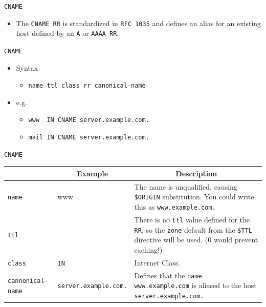 \documentclass[xcolor=table]{beamer}
\begin{document}
\begin{frame}{\texttt{CNAME}}
  \begin{itemize}
      \item The \texttt{CNAME RR} is standardized in \texttt{RFC 1035} and defines an alias for an existing host defined by an \texttt{A} or \texttt{AAAA RR}.
  \end{itemize}
\end{frame}

\begin{frame}{\texttt{CNAME}}
  \begin{itemize}
    \item Syntax
      \begin{itemize}
        \item \texttt{name ttl class rr canonical-name}
      \end{itemize}
    \item e.g.
      \begin{itemize}
        \item \texttt{www ~IN CNAME server.example.com.}
        \item \texttt{mail IN CNAME server.example.com.}
      \end{itemize}
  \end{itemize}
\end{frame}

\begin{frame}{\texttt{CNAME}}
  \begin{table}
    \tiny
    \begin{tabular}{|p{1.6cm}|p{1.9cm}|p{4.7cm}|} 
      \hline
      \rowcolor{gray}
      \multicolumn{1}{|c|}{Syntax} & \multicolumn{1}{c|}{Example} & \multicolumn{1}{c|}{Description}\\ 
      \hline
      \texttt{name}&www&The name is unqualified, causing \texttt{\$ORIGIN} substitution. You could write this as \texttt{www.example.com.}\\
      \hline
      \texttt{ttl}&&There is no \texttt{ttl} value defined for the \texttt{RR}, so the \texttt{zone} default from the \texttt{\$TTL} directive will be used. (0 would prevent caching!)\\
      \hline
      \texttt{class}&\texttt{IN}&Internet Class.\\
      \hline
      \texttt{cannonical-name}&\texttt{server.example.com.}&Defines that the \texttt{name www.example.com} is aliased to the host \texttt{server.example.com.}\\
      \hline
    \end{tabular}
  \end{table}
\end{frame}
\end{document}
